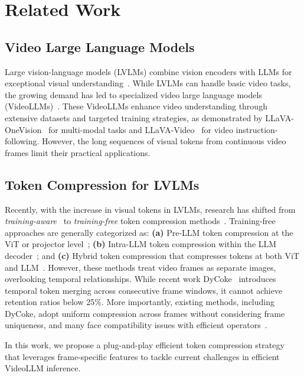 \section{Related Work}

\subsection{Video Large Language Models}


Large vision-language models (LVLMs) combine vision encoders with LLMs for exceptional visual understanding~\cite{li2024llava-ov,Wang:Qwen2-VL}. While LVLMs can handle basic video tasks, the growing demand has led to specialized video large language models (VideoLLMs)~\cite{zhang2024llava-video,Zhang:Video-LLaMA}. These VideoLLMs enhance video understanding through extensive datasets and targeted training strategies, as demonstrated by LLaVA-OneVision~\cite{li2024llava-ov} for multi-modal tasks and LLaVA-Video~\cite{zhang2024llava-video} for video instruction-following. However, the long sequences of visual tokens from continuous video frames limit their practical applications.




\subsection{Token Compression for LVLMs}

Recently, with the increase in visual tokens in LVLMs, research has shifted from \textit{training-aware}~\cite{Li:TokenPacker} to \textit{training-free} token compression methods~\cite{Yang2024:Visionzip}. Training-free approaches are generally categorized as: \textbf{(a)} Pre-LLM token compression at the ViT or projector level~\cite{Zhang:FasterVLM,liu2025globalcom2}; \textbf{(b)} Intra-LLM token compression within the LLM decoder~\cite{Chen:FastV,Zhang:SparseVLM,chen2025v2drop}; and \textbf{(c)} Hybrid token compression that compresses tokens at both ViT and LLM~\cite{Han2024:FiCoCo}. However, these methods treat video frames as separate images, overlooking temporal relationships. While recent work DyCoke~\cite{tao2024dycoke} introduces temporal token merging across consecutive frame windows, it cannot achieve retention ratios below 25\%. More importantly, existing methods, including DyCoke, adopt uniform compression across frames without considering frame uniqueness, and many face compatibility issues with efficient operators~\cite{Dao2022:FlashAttention}.


In this work, we propose a plug-and-play efficient token compression strategy that leverages frame-specific features to tackle current challenges in efficient VideoLLM inference.

